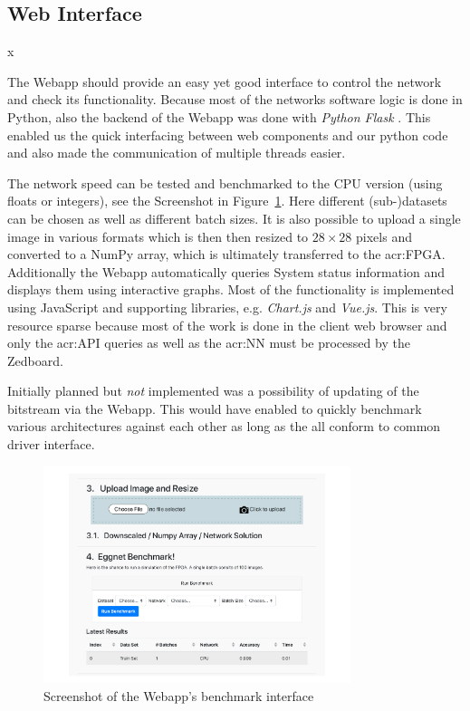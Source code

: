 \subsection{Web Interface}x

The Webapp should provide an easy yet good interface to control the network and check its functionality. Because most of the networks software logic is done in Python, also the backend of the Webapp was done with \emph{Python Flask} \cite{Pallets:2020aa}. This enabled us the quick interfacing between web components and our python code and also made the communication of multiple threads easier.

The network speed can be tested and benchmarked to the CPU version (using floats or integers), see the Screenshot in Figure~\ref{fig:sw-webapp-bench}. Here different (sub-)datasets can be chosen as well as different batch sizes. It is also possible to upload a single image in various formats which is then then resized to $28 \times 28$ pixels and converted to a NumPy array, which is ultimately transferred to the \gls{acr:FPGA}. Additionally the Webapp automatically queries System status information and displays them using interactive graphs. Most of the functionality is implemented using JavaScript and supporting libraries, e.g. \emph{Chart.js} and \emph{Vue.js}. This is very resource sparse because most of the work is done in the client web browser and only the \gls{acr:API} queries as well as the \gls{acr:NN} must be processed by the Zedboard.

Initially planned but \emph{not} implemented was a possibility of updating of the bitstream via the Webapp. This would have enabled to quickly benchmark various architectures against each other as long as the all conform to common driver interface.

\begin{figure}[hbtp]
  \centering
  \includegraphics[width=0.8\textwidth]{img/webapp_bench}
  \caption{Screenshot of the Webapp's benchmark interface}
  \label{fig:sw-webapp-bench}
\end{figure}


